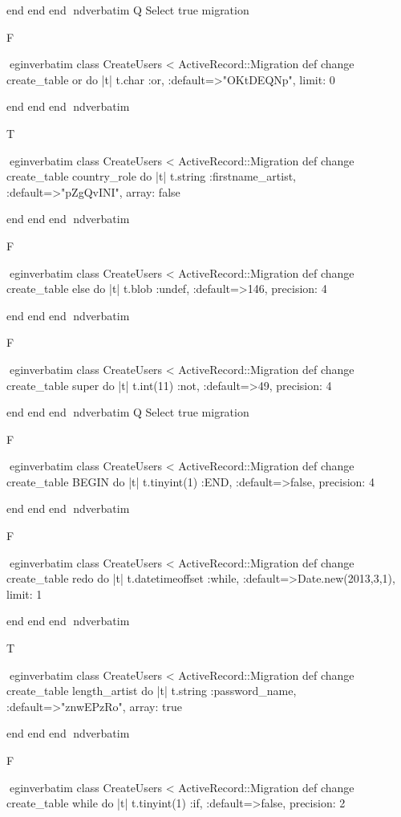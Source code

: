     end 
  end 
end
nd{verbatim}
Q
 Select true migration

F

egin{verbatim}
 class CreateUsers < ActiveRecord::Migration 
  def change 
    create_table or do |t| 
      t.char :or, :default=>"OKtDEQNp", limit: 0
    
    end 
  end 
end
nd{verbatim}

T

egin{verbatim}
 class CreateUsers < ActiveRecord::Migration 
  def change 
    create_table country_role do |t| 
      t.string :firstname_artist, :default=>"pZgQvINI", array: false
    
    end 
  end 
end
nd{verbatim}

F

egin{verbatim}
 class CreateUsers < ActiveRecord::Migration 
  def change 
    create_table else do |t| 
      t.blob :undef, :default=>146, precision: 4
    
    end 
  end 
end
nd{verbatim}

F

egin{verbatim}
 class CreateUsers < ActiveRecord::Migration 
  def change 
    create_table super do |t| 
      t.int(11) :not, :default=>49, precision: 4
    
    end 
  end 
end
nd{verbatim}
Q
 Select true migration

F

egin{verbatim}
 class CreateUsers < ActiveRecord::Migration 
  def change 
    create_table BEGIN do |t| 
      t.tinyint(1) :END, :default=>false, precision: 4
    
    end 
  end 
end
nd{verbatim}

F

egin{verbatim}
 class CreateUsers < ActiveRecord::Migration 
  def change 
    create_table redo do |t| 
      t.datetimeoffset :while, :default=>Date.new(2013,3,1), limit: 1
    
    end 
  end 
end
nd{verbatim}

T

egin{verbatim}
 class CreateUsers < ActiveRecord::Migration 
  def change 
    create_table length_artist do |t| 
      t.string :password_name, :default=>"znwEPzRo", array: true
    
    end 
  end 
end
nd{verbatim}

F

egin{verbatim}
 class CreateUsers < ActiveRecord::Migration 
  def change 
    create_table while do |t| 
      t.tinyint(1) :if, :default=>false, precision: 2
    

